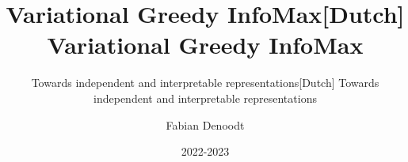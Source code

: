 \documentclass[]{book}
\title{Variational Greedy InfoMax}
\subtitle{Towards independent and interpretable representations}
\author{Fabian Denoodt}
\date{2022-2023}
\begin{document}
\maketitle
\title{[Dutch] Variational Greedy InfoMax}
\subtitle{[Dutch] Towards independent and interpretable representations}
\maketitle

\tableofcontents


\newcommand*\annotatedFigureBoxCustom[8]{\draw[#5,thick,rounded corners] (#1) rectangle (#2);\node at (#4) [fill=#6,thick,shape=circle,draw=#7,inner sep=2pt,font=\sffamily,text=#8] {\textbf{#3}};}

\newcommand*\annotatedFigureBox[4]{\annotatedFigureBoxCustom{#1}{#2}{#3}{#4}{white}{white}{black}{black}}


\newcommand*\annotatedFigureText[5]{\node[draw=none, anchor=south west, text=#2, inner sep=0, text width=#3\linewidth,font=\sffamily\fontsize{#5}{14}\selectfont] at (#1){#4};}


\newenvironment {annotatedFigure}[1]{\centering\begin{tikzpicture}
		\node[anchor=south west,inner sep=0] (image) at (0,0) { #1};\begin{scope}[x={(image.south east)},y={(image.north west)}]}{\end{scope}\end{tikzpicture}}


\newcommand{\vect}[1]{\mathbf{#1}}
\newcommand{\vecti}[1]{\mathbf{#1}^{(i)}}
\newcommand{\vectj}[1]{\mathbf{#1}^{(j)}}
\end{document}
